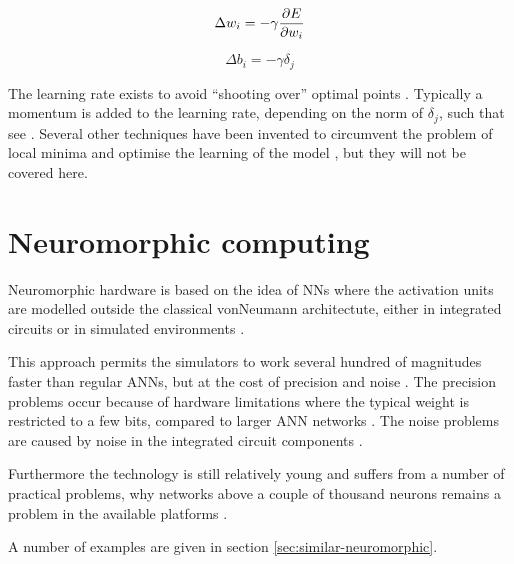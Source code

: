 \documentclass[report.tex]{subfiles}
\begin{document}
\begin{equation}
  \Delta w_i = -\gamma {\partial E \over \partial w_i}
  \label{eq:bp-update}
\end{equation}

\begin{equation}
  \Delta b_i = -\gamma \delta_j
  \label{eq:bp-update-bias}
\end{equation}

The learning rate exists to avoid ``shooting over'' optimal points
\cite{Russel2007}.
Typically a momentum is added to the learning rate, depending on the norm of
$\delta_j$, such that see \cite{Sutskever2013, LeCun1998}. 
Several other techniques have been invented to circumvent the problem of 
local minima and optimise the learning of the model \cite{LeCun1998,
Schmidhuber2014}, but they will not be covered here.

\section{Neuromorphic computing}
Neuromorphic hardware is based on the idea of \gls{NN}s where the activation
units are modelled outside the classical \gls{vonNeumann} architectute, either in 
integrated circuits or in simulated environments \cite{Albada2018,Blundell2018,Schmitt2017}.

This approach permits the simulators to work several hundred of magnitudes
faster than regular \gls{ANN}s, but at the cost of precision and noise
\cite{Indiveri2015, Schmitt2017}.
The precision problems occur because of hardware limitations where the typical
weight is restricted to a few bits, compared to larger \gls{ANN} networks
\cite{Indiveri2015, Lin2018}.
The noise problems are caused by noise in the integrated circuit components 
\cite{Lin2018, Pfeil2013}.

Furthermore the technology is still relatively young and suffers from a number
of practical problems, why networks above a couple of thousand neurons remains
a problem in the available platforms \cite{Schmitt2017}.

A number of examples are given in section \ref{sec:similar-neuromorphic}.

\end{document}
